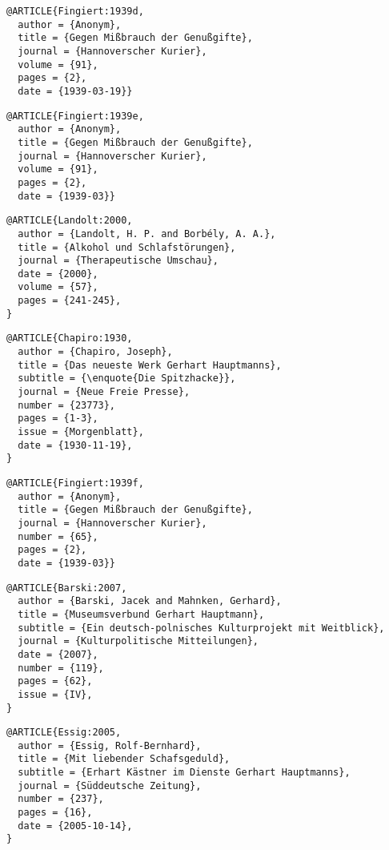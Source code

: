 \documentclass[english]{scrartcl}
\begin{document}
\begin{lstlisting}
@ARTICLE{Fingiert:1939d,
  author = {Anonym},
  title = {Gegen Mißbrauch der Genußgifte},
  journal = {Hannoverscher Kurier},
  volume = {91},
  pages = {2},
  date = {1939-03-19}}
\end{lstlisting}

\begin{lstlisting}
@ARTICLE{Fingiert:1939e,
  author = {Anonym},
  title = {Gegen Mißbrauch der Genußgifte},
  journal = {Hannoverscher Kurier},
  volume = {91},
  pages = {2},
  date = {1939-03}}
\end{lstlisting}

\begin{lstlisting}
@ARTICLE{Landolt:2000,
  author = {Landolt, H. P. and Borbély, A. A.},
  title = {Alkohol und Schlafstörungen},
  journal = {Therapeutische Umschau},
  date = {2000},
  volume = {57},
  pages = {241-245},
}
\end{lstlisting}

\begin{lstlisting}
@ARTICLE{Chapiro:1930,
  author = {Chapiro, Joseph},
  title = {Das neueste Werk Gerhart Hauptmanns},
  subtitle = {\enquote{Die Spitzhacke}},
  journal = {Neue Freie Presse},
  number = {23773},
  pages = {1-3},
  issue = {Morgenblatt},
  date = {1930-11-19},
}
\end{lstlisting}
\foreignlanguage{german}{}

\begin{lstlisting}
@ARTICLE{Fingiert:1939f,
  author = {Anonym},
  title = {Gegen Mißbrauch der Genußgifte},
  journal = {Hannoverscher Kurier},
  number = {65},
  pages = {2},
  date = {1939-03}}
\end{lstlisting}

\begin{lstlisting}
@ARTICLE{Barski:2007,
  author = {Barski, Jacek and Mahnken, Gerhard},
  title = {Museumsverbund Gerhart Hauptmann},
  subtitle = {Ein deutsch-polnisches Kulturprojekt mit Weitblick},
  journal = {Kulturpolitische Mitteilungen},
  date = {2007},
  number = {119},
  pages = {62},
  issue = {IV},
}
\end{lstlisting}

\begin{lstlisting}
@ARTICLE{Essig:2005,
  author = {Essig, Rolf-Bernhard},
  title = {Mit liebender Schafsgeduld},
  subtitle = {Erhart Kästner im Dienste Gerhart Hauptmanns},
  journal = {Süddeutsche Zeitung},
  number = {237},
  pages = {16},
  date = {2005-10-14},
}
\end{lstlisting}
\end{document}
